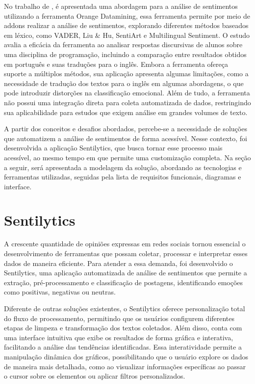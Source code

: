 \documentclass[
	12pt,				%
	oneside,			%
	a4paper,			%
	english,			%
	french,				%
	spanish,			%
	brazil				%
	]{abntex2}
\begin{document}
No trabalho de , é apresentada uma
abordagem para a análise de sentimentos utilizando a ferramenta Orange
Datamining, essa ferramenta permite por meio de addons realizar a
análise de sentimentos, explorando diferentes métodos baseados em
léxico, como VADER, Liu \& Hu, SentiArt e Multilingual Sentiment. O
estudo avalia a eficácia da ferramenta ao analisar respostas discursivas
de alunos sobre uma disciplina de programação, incluindo a comparação
entre resultados obtidos em português e suas traduções para o inglês.
Embora a ferramenta ofereça suporte a múltiplos métodos, sua aplicação
apresenta algumas limitações, como a necessidade de tradução dos textos
para o inglês em algumas abordagens, o que pode introduzir distorções na
classificação emocional. Além de tudo, a ferramenta não possui uma
integração direta para coleta automatizada de dados, restringindo sua
aplicabilidade para estudos que exigem análise em grandes volumes de
texto.

A partir dos conceitos e desafios abordados, percebe-se a necessidade de
soluções que automatizem a análise de sentimentos de forma acessível.
Nesse contexto, foi desenvolvida a aplicação Sentilytics, que busca
tornar esse processo mais acessível, ao mesmo tempo em que permite uma
customização completa. Na seção a seguir, será apresentada a modelagem
da solução, abordando as tecnologias e ferramentas utilizadas, seguidas
pela lista de requisitos funcionais, diagramas e interface.

\hypertarget{sentilytics}{%
\chapter{Sentilytics}\label{sentilytics}}

A crescente quantidade de opiniões expressas em redes sociais tornou
essencial o desenvolvimento de ferramentas que possam coletar, processar
e interpretar esses dados de maneira eficiente. Para atender a essa
demanda, foi desenvolvido o Sentilytics, uma aplicação automatizada de
análise de sentimentos que permite a extração, pré-processamento e
classificação de postagens, identificando emoções como positivas,
negativas ou neutras.

Diferente de outras soluções existentes, o Sentilytics oferece
personalização total do fluxo de processamento, permitindo que os
usuários configurem diferentes etapas de limpeza e transformação dos
textos coletados. Além disso, conta com uma interface intuitiva que
exibe os resultados de forma gráfica e interativa, facilitando a análise
das tendências identificadas. Essa interatividade permite a manipulação
dinâmica dos gráficos, possibilitando que o usuário explore os dados de
maneira mais detalhada, como ao visualizar informações específicas ao
passar o cursor sobre os elementos ou aplicar filtros personalizados.
\end{document}
